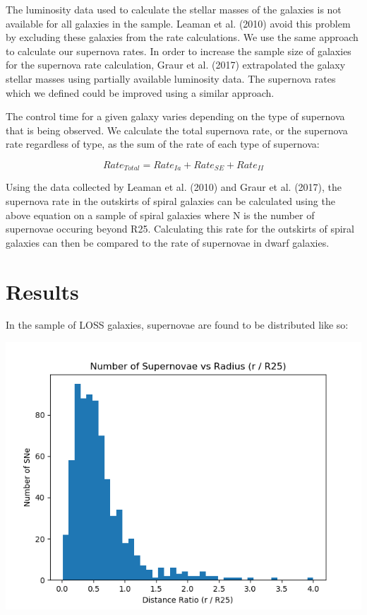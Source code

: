 \documentclass[apj]{emulateapj}
\begin{document}
The luminosity data used to calculate the stellar masses of the galaxies is not available for all galaxies in the sample. Leaman et al. (2010) avoid this problem by excluding these galaxies from the rate calculations. We use the same approach to calculate our supernova rates. In order to increase the sample size of galaxies for the supernova rate calculation, Graur et al. (2017) extrapolated the galaxy stellar masses using partially available luminosity data. The supernova rates which we defined could be improved using a similar approach.

The control time for a given galaxy varies depending on the type of supernova that is being observed. We calculate the total supernova rate, or the supernova rate regardless of type, as the sum of the rate of each type of supernova:

\begin{equation}
Rate_{Total}=Rate_{Ia}+Rate_{SE}+Rate_{II}
\end{equation}

Using the data collected by Leaman et al. (2010) and Graur et al. (2017), the supernova rate in the outskirts of spiral galaxies can be calculated using the above equation on a sample of spiral galaxies where N is the number of supernovae occuring beyond R25. Calculating this rate for the outskirts of spiral galaxies can then be compared to the rate of supernovae in dwarf galaxies.

\section{Results}

In the sample of LOSS galaxies, supernovae are found to be distributed like so:

\includegraphics[scale=0.5]{sne_vs_radius}
\end{document}

